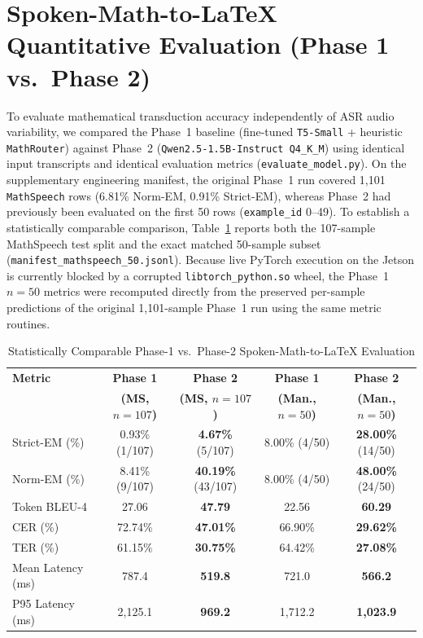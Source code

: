 \documentclass[11pt,a4paper,oneside]{report}
\begin{document}
\section{Spoken-Math-to-LaTeX Quantitative Evaluation (Phase 1 vs.\ Phase 2)}
\label{sec:phase1_phase2_eval}
To evaluate mathematical transduction accuracy independently of ASR audio variability, we compared the Phase~1 baseline (fine-tuned \texttt{T5-Small} + heuristic \texttt{MathRouter}) against Phase~2 (\texttt{Qwen2.5-1.5B-Instruct Q4\_K\_M}) using identical input transcripts and identical evaluation metrics (\texttt{evaluate\_model.py}). On the supplementary engineering manifest, the original Phase~1 run covered 1,101 \texttt{MathSpeech} rows (6.81\% Norm-EM, 0.91\% Strict-EM), whereas Phase~2 had previously been evaluated on the first 50 rows (\texttt{example\_id} 0--49). To establish a statistically comparable comparison, Table~\ref{tab:phase1_phase2} reports both the 107-sample MathSpeech test split and the exact matched 50-sample subset (\texttt{manifest\_mathspeech\_50.jsonl}). Because live PyTorch execution on the Jetson is currently blocked by a corrupted \texttt{libtorch\_python.so} wheel, the Phase~1 $n=50$ metrics were recomputed directly from the preserved per-sample predictions of the original 1,101-sample Phase~1 run using the same metric routines.

\begin{table}[htbp]
\centering
\footnotesize
\setlength{\tabcolsep}{4pt}
\caption{Statistically Comparable Phase-1 vs.\ Phase-2 Spoken-Math-to-LaTeX Evaluation}
\label{tab:phase1_phase2}
\begin{tabularx}{\textwidth}{>{\raggedright\arraybackslash}X c c c c}
\toprule
\textbf{Metric} & \textbf{Phase 1} & \textbf{Phase 2} & \textbf{Phase 1} & \textbf{Phase 2} \\
 & \textbf{(MS, $n=107$)} & \textbf{(MS, $n=107$)} & \textbf{(Man., $n=50$)} & \textbf{(Man., $n=50$)} \\
\midrule
Strict-EM (\%)       & 0.93\% (1/107)   & \textbf{4.67\%} (5/107)   & 8.00\% (4/50)    & \textbf{28.00\%} (14/50) \\
Norm-EM (\%)         & 8.41\% (9/107)   & \textbf{40.19\%} (43/107) & 8.00\% (4/50)    & \textbf{48.00\%} (24/50) \\
Token BLEU-4         & 27.06            & \textbf{47.79}            & 22.56            & \textbf{60.29} \\
CER (\%)             & 72.74\%          & \textbf{47.01\%}          & 66.90\%          & \textbf{29.62\%} \\
TER (\%)             & 61.15\%          & \textbf{30.75\%}          & 64.42\%          & \textbf{27.08\%} \\
Mean Latency (ms)    & 787.4            & \textbf{519.8}            & 721.0            & \textbf{566.2} \\
P95 Latency (ms)     & 2,125.1          & \textbf{969.2}            & 1,712.2          & \textbf{1,023.9} \\
\bottomrule
\end{tabularx}
\end{table}
\end{document}
